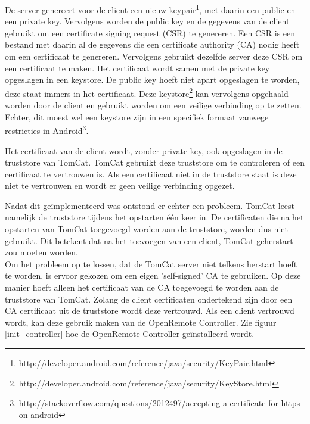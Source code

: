 \documentclass[]{article}
\begin{document}
De server genereert voor de client een nieuw
keypair\footnote{http://developer.android.com/reference/java/security/KeyPair.html}, met daarin een
public en een private key. Vervolgens worden de public key en de gegevens van de
client gebruikt om een certificate signing request (CSR) te genereren. Een
CSR is een bestand met daarin al de gegevens die een certificate authority (CA)
nodig heeft om een certificaat te genereren. Vervolgens gebruikt dezelfde server
deze CSR om een certificaat te maken. Het certificaat wordt samen met de private
key opgeslagen in een keystore. De public key hoeft niet apart opgeslagen te
worden, deze staat immers in het certificaat. Deze
keystore\footnote{http://developer.android.com/reference/java/security/KeyStore.html} kan vervolgens
opgehaald worden door de client en gebruikt worden om een veilige verbinding op
te zetten. Echter, dit moest wel een keystore zijn in een specifiek formaat
vanwege restricties in
Android\footnote{http://stackoverflow.com/questions/2012497/accepting-a-certificate-for-https-on-android}.

Het certificaat van de client wordt, zonder private key, ook opgeslagen in de
truststore van TomCat. TomCat gebruikt deze truststore om te controleren of een
certificaat te vertrouwen is. Als een certificaat niet in de truststore staat
is deze niet te vertrouwen en wordt er geen veilige verbinding opgezet. 

Nadat dit ge\"implementeerd was ontstond er echter een probleem. TomCat leest
namelijk de truststore tijdens het opstarten \'e\'en keer in. De certificaten
die na het opstarten van TomCat toegevoegd worden aan de truststore, worden dus
niet gebruikt. Dit betekent dat na het toevoegen van een client, TomCat
geherstart zou moeten worden.  \\Om het probleem op te lossen, dat de TomCat
server niet telkens herstart hoeft te worden, is ervoor gekozen om een eigen
'self-signed' CA te gebruiken. Op deze manier hoeft alleen het certificaat van
de CA toegevoegd te worden aan de truststore van TomCat.  Zolang de client
certificaten ondertekend zijn door een CA certificaat uit de truststore wordt
deze vertrouwd. Als een client vertrouwd wordt, kan deze gebruik maken van de
OpenRemote Controller. Zie figuur \ref{init_controller} hoe de OpenRemote
Controller ge\"installeerd wordt.

\newpage
\end{document}
